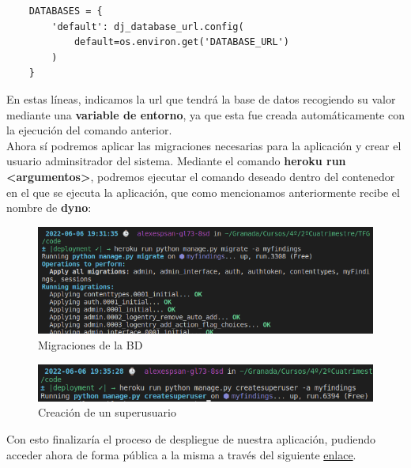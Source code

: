 \begin{verbatim}
    DATABASES = {
        'default': dj_database_url.config(
            default=os.environ.get('DATABASE_URL')
        )
    }
\end{verbatim}

En estas líneas, indicamos la url que tendrá la base de datos recogiendo su valor mediante
una \textbf{variable de entorno}, ya que esta fue creada automáticamente con la ejecución
del comando anterior.\\

Ahora sí podremos aplicar las migraciones necesarias para la aplicación y crear el
usuario adminsitrador del sistema. Mediante el comando \textbf{heroku run <argumentos>},
podremos ejecutar el comando deseado dentro del contenedor en el que se ejecuta la
aplicación, que como mencionamos anteriormente recibe el nombre de \textbf{dyno}:

    \begin{figure}[H]
        \centering
        \includegraphics[scale=0.50]{imagenes/heroku-migrate.png}
        \caption{Migraciones de la BD}
        \label{fig:heroku-migrate}
    \end{figure}

    \begin{figure}[H]
        \centering
        \includegraphics[scale=0.55]{imagenes/heroku-createsuperuser.png}
        \caption{Creación de un superusuario}
        \label{fig:heroku-createsuperuser}
    \end{figure}

Con esto finalizaría el proceso de despliegue de nuestra aplicación, pudiendo acceder
ahora de forma pública a la misma a través del siguiente
\href{https://myfindings.herokuapp.com/}{enlace}.
